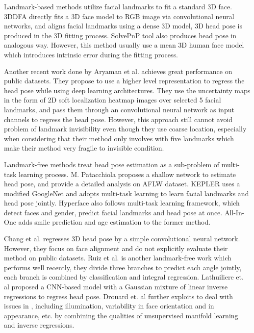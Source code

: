 \documentclass{article}
\begin{document}
\begin{CJK*}{UTF8}{gkai}
Landmark-based methods utilize facial landmarks to fit a standard 3D face. 3DDFA \cite{zhu2016face} directly fits a 3D face model to RGB image via convolutional neural networks, and aligns facial landmarks using a dense 3D model, 3D head pose is produced in the 3D fitting process. SolvePnP tool \cite{gao2003complete} also produces head pose in analogous way. However, this method usually use a mean 3D human face model which introduces intrinsic error during the fitting process.

Another recent work done by Aryaman et al. \cite{gupta2018nose} achieves great performance on public datasets. They propose to use a higher level representation to regress the head pose while using deep learning architectures. They use the uncertainty maps in the form of 2D soft localization heatmap images over selected 5 facial landmarks, and pass them through an convolutional neural network as input channels to regress the head pose. However, this approach still cannot avoid problem of landmark invisibility even though they use coarse location, especially when considering that their method only involves with five landmarks which make their method very fragile to invisible condition.

Landmark-free methods treat head pose estimation as a sub-problem of multi-task learning process. M. Patacchiola\cite{patacchiola2017head} proposes a shallow network to estimate head pose, and provide a detailed analysis on AFLW dataset. KEPLER\cite{kumar2017kepler} uses a modified GoogleNet and adopts multi-task learning to learn facial landmarks and head pose jointly. Hyperface\cite{ranjan2016hyperface} also follows multi-task learning framework, which detect faces and gender, predict facial landmarks and head pose at once. All-In-One\cite{ranjan2017all} adds smile prediction and age estimation to the former method.

Chang et al.\cite{chang2017faceposenet} regresses 3D head pose by a simple convolutional neural network. However, they focus on face alignment and do not explicitly evaluate their method on public datasets. Ruiz et al.\cite{ruiz2017fine} is another landmark-free work which performs well recently, they divide three branches to predict each angle jointly, each branch is combined by classification and integral regression. Lathuiliere et. al\cite{lathuiliere2017deep} proposed a CNN-based model with a Gaussian mixture of linear inverse regressions to regress head pose. Drouard et. al\cite{drouard2017robust} further exploits to deal with issues in \cite{lathuiliere2017deep}, including illumination, variability in face orientation and in appearance, etc. by combining the qualities of unsupervised manifold learning and inverse regressions. 


\end{CJK*}
\end{document}
